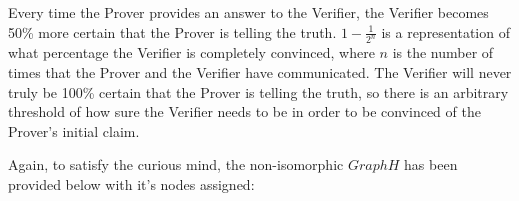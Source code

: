 \documentclass[12pt]{article}
\begin{document}
Every time the Prover provides an answer to the Verifier, the Verifier becomes 50\% more certain that the Prover is telling the truth. $1 - \frac{1}{2^n}$ is a representation of what percentage the Verifier is completely convinced, where $n$ is the number of times that the Prover and the Verifier have communicated. The Verifier will never truly be 100\% certain that the Prover is telling the truth, so there is an arbitrary threshold of how sure the Verifier needs to be in order to be convinced of the Prover's initial claim.

Again, to satisfy the curious mind, the non-isomorphic $Graph H$ has been provided below with it's nodes assigned:




\end{document}
